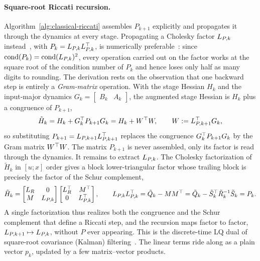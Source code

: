 \paragraph{Square-root Riccati recursion.}
Algorithm~\ref{alg:classical-riccati} assembles $P_{k+1}$ explicitly and propagates
it through the dynamics at every stage. Propagating a Cholesky factor $L_{P,k}$
instead~\cite{frison2013efficient}, with $P_k = L_{P,k} L_{P,k}^\top$, is numerically preferable~\cite{kaminski1971discrete}: since
$\operatorname{cond}(P_k) = \operatorname{cond}(L_{P,k})^2$, every operation carried out on the factor works
at the square root of the condition number of $P_k$ and hence loses only half as
many digits to rounding.
The derivation rests on the observation that one backward step is entirely a
\emph{Gram-matrix} operation. With the stage Hessian $H_k$ and the input-major
dynamics $G_k = \begin{bmatrix} B_k & A_k \end{bmatrix}$, the augmented stage
Hessian is $H_k$ plus a congruence of $P_{k+1}$,
\[
\tilde{H}_k = H_k + G_k^\top P_{k+1} G_k = H_k + W^\top W ,
\qquad W := L_{P,k+1}^\top G_k ,
\]
so substituting $P_{k+1} = L_{P,k+1}L_{P,k+1}^\top$ replaces the congruence
$G_k^\top P_{k+1} G_k$ by the Gram matrix $W^\top W$. The matrix $P_{k+1}$ is never assembled,
only its factor is read through the dynamics. It remains to extract $L_{P,k}$.
The Cholesky factorization of $\tilde{H}_k$ in $[u;x]$ order gives a
block lower-triangular factor whose trailing block is precisely the factor of the
Schur complement,
\[
\tilde{H}_k =
\begin{bmatrix} L_R & 0 \\ M & L_{P,k} \end{bmatrix}
\begin{bmatrix} L_R^\top & M^\top \\ 0 & L_{P,k}^\top \end{bmatrix} ,
\qquad
L_{P,k} L_{P,k}^\top = \tilde Q_k - M M^\top
                     = \tilde Q_k - \tilde S_k^\top \tilde R_k^{-1} \tilde S_k = P_k .
\]
A single factorization thus realizes both the congruence and the Schur complement
that define a Riccati step, and the recursion maps factor to factor,
$L_{P,k+1} \mapsto L_{P,k}$, without $P$ ever appearing. This is the discrete-time
LQ dual of square-root covariance (Kalman) filtering~\cite{kalman1960new,kaminski1971discrete}. The linear terms ride along as
a plain vector $p_k$, updated by a few matrix--vector products.

